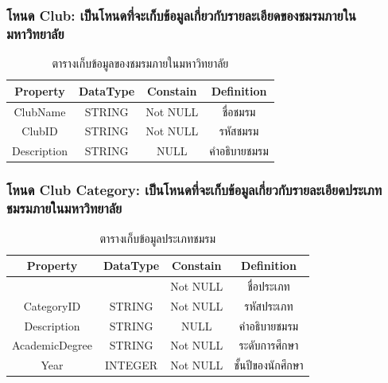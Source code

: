 \documentclass[14pt,oneside,openright,a4paper]{cpe-thai-project}
\begin{document}
    \subsubsection{โหนด Club: เป็นโหนดที่จะเก็บข้อมูลเกี่ยวกับรายละเอียดของชมรมภายในมหาวิทยาลัย}
    \begin{table}[!h]\centering
      \begin{tabular}{|c|c|c|c|}
      \hline
      \rowcolor[HTML]{9FC5E8} 
      Property    & DataType & Constain & Definition   \\ \hline
      ClubName    & STRING   & Not NULL & ชื่อชมรม     \\ \hline
      ClubID      & STRING   & Not NULL & รหัสชมรม     \\ \hline
      Description & STRING   & NULL     & คำอธิบายชมรม \\ \hline
      \end{tabular}
      \caption{\centering ตารางเก็บข้อมูลของชมรมภายในมหาวิทยาลัย}\label{tab:Club Node}
    \end{table}

    \subsubsection{โหนด Club Category: เป็นโหนดที่จะเก็บข้อมูลเกี่ยวกับรายละเอียดประเภทชมรมภายในมหาวิทยาลัย}
    \begin{table}[!h]\centering
      \begin{tabular}{|c|c|c|c|}
      \hline
      \rowcolor[HTML]{9FC5E8} 
      Property       & {\color[HTML]{242424} DataType} & Constain & Definition        \\ \hline
      \cellcolor[HTML]{FFFFFF}{\color[HTML]{242424} CategoryName} & \cellcolor[HTML]{FFFFFF}{\color[HTML]{242424} STRING} & Not NULL & ชื่อประเภท \\ \hline
      CategoryID     & STRING                          & Not NULL & รหัสประเภท        \\ \hline
      Description    & STRING                          & NULL     & คำอธิบายชมรม      \\ \hline
      AcademicDegree & STRING                          & Not NULL & ระดับการศึกษา     \\ \hline
      Year           & INTEGER                         & Not NULL & ชั้นปีของนักศึกษา \\ \hline
      \end{tabular}
      \caption{\centering ตารางเก็บข้อมูลประเภทชมรม}\label{tab:Club Category Node}
    \end{table}
\end{document}
